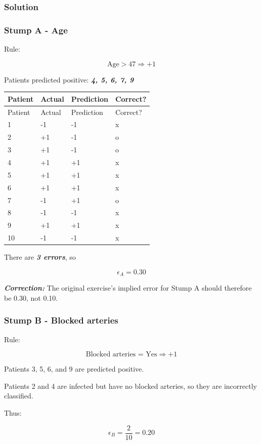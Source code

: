 \documentclass[10pt]{article}
\begin{document}
\subsubsection*{Solution}
\subsubsection*{Stump A - Age}
Rule:

\[
\text{Age}>47 \Rightarrow +1
\]

Patients predicted positive: \textbf{\textit{4, 5, 6, 7, 9}}

\begingroup
\small
\setlength{\tabcolsep}{4pt}
\begin{longtable}{l|l|l|l}
Patient & Actual & Prediction & Correct? \\[1.5pt]
\hline
\endfirsthead
Patient & Actual & Prediction & Correct? \\[1.5pt]
\hline
\endhead
1 & -1 & -1 & x \\[1.5pt]
2 & +1 & -1 & o \\[1.5pt]
3 & +1 & -1 & o \\[1.5pt]
4 & +1 & +1 & x \\[1.5pt]
5 & +1 & +1 & x \\[1.5pt]
6 & +1 & +1 & x \\[1.5pt]
7 & -1 & +1 & o \\[1.5pt]
8 & -1 & -1 & x \\[1.5pt]
9 & +1 & +1 & x \\[1.5pt]
10 & -1 & -1 & x \\[1.5pt]
\end{longtable}
\endgroup
There are \textbf{\textit{3 errors}}, so

\[
{\epsilon_A=0.30}
\]

\textbf{\textit{Correction:}} The original exercise's implied error for Stump A should therefore be 0.30, not 0.10.

\subsubsection*{Stump B - Blocked arteries}
Rule:

\[
\text{Blocked arteries = Yes} \Rightarrow +1
\]

Patients 3, 5, 6, and 9 are predicted positive.

Patients 2 and 4 are infected but have no blocked arteries, so they are incorrectly classified.

Thus:

\[
{\epsilon_B=\frac{2}{10}=0.20}
\]
\end{document}
